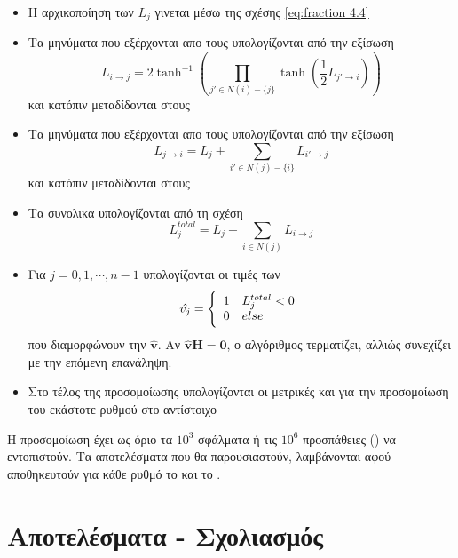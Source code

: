 \begin{itemize}
\item Η αρχικοποίηση των $L_j$ γινεται μέσω της σχέσης \ref{eq:fraction 4.4}
\item Τα μηνύματα που εξέρχονται απο τους  υπολογίζονται από την εξίσωση 
\begin{equation}
L_{i\to j} = 2\tanh^{-1} \left( \prod_{j'\in N(i)-\lbrace j\rbrace} \tanh \left( \frac{1}{2}L_{j'\to i} \right)\right)
\end{equation}
και κατόπιν μεταδίδονται στους 
\item Τα μηνύματα που εξέρχονται απο τους  υπολογίζονται από την εξίσωση
\begin{equation*}
L_{j\to i} = L_j + \sum_{i'\in N(j)-\lbrace i\rbrace} L_{i'\to j}
\end{equation*}
και κατόπιν μεταδίδονται στους 
\item Τα συνολικα  υπολογίζονται από τη σχέση
\begin{equation*}
L_{j}^{total} = L_j + \sum_{i\in N(j)} L_{i\to j}
\end{equation*}
\item Για $j=0,1,\cdots,n-1$ υπολογίζονται οι τιμές των 
\begin{equation*}
\hat{v_j}=\left\{
\begin{array}{c l}	
     1 & L_{j}^{total}<0\\
     0 & else
\end{array}\right.
\end{equation*}
που διαμορφώνουν την $\hat{\mathbf{v}}$. Αν $\hat{\mathbf{v}}\mathbf{Η}=\mathbf{0}$, ο αλγόριθμος τερματίζει, αλλιώς συνεχίζει με την επόμενη επανάληψη.
\item Στο τέλος της προσομοίωσης υπολογίζονται οι μετρικές  και  για την προσομοίωση του εκάστοτε ρυθμού στο αντίστοιχο 
\end{itemize}


Η προσομοίωση έχει ως όριο τα $10^3$ σφάλματα ή τις $10^6$ προσπάθειες () να εντοπιστούν. Τα αποτελέσματα που θα παρουσιαστούν, λαμβάνονται αφού αποθηκευτούν για κάθε ρυθμό το  και το .

\section{Αποτελέσματα - Σχολιασμός}


